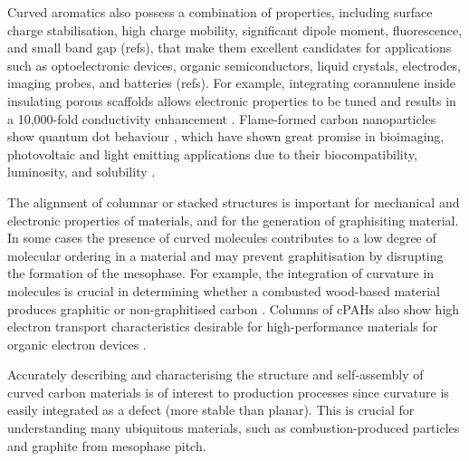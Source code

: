 Curved aromatics also possess a combination of properties, including surface charge stabilisation, high charge mobility, significant dipole moment, fluorescence, and small band gap (refs), that make them excellent candidates for applications such as optoelectronic devices, organic semiconductors, liquid crystals, electrodes, imaging probes, and batteries (refs). For example, integrating corannulene inside insulating porous scaffolds allows electronic properties to be tuned and results in a 10,000-fold conductivity enhancement \cite{rice2018stack}. Flame-formed carbon nanoparticles show quantum dot behaviour \cite{liu2019flame}, which have shown great promise in bioimaging, photovoltaic and light emitting applications due to their biocompatibility, luminosity, and solubility \cite{zhang2012graphene}.

The alignment of columnar or stacked structures is important for mechanical and electronic properties of materials, and for the generation of graphisiting material. In some cases the presence of curved molecules contributes to a low degree of molecular ordering in a material %
\cite{zhong2018structural} and may prevent graphitisation by disrupting the formation of the mesophase. For example, the integration of curvature in molecules is crucial in determining whether a combusted wood-based material produces graphitic or non-graphitised carbon \cite{abrahamson2018carbon}. Columns of cPAHs also show high electron transport characteristics desirable for high-performance materials for organic electron devices \cite{wang2015electronic}.

Accurately describing and characterising the structure and self-assembly of curved carbon materials is of interest to production processes since curvature is easily integrated as a defect (more stable than planar). This is crucial for understanding many ubiquitous materials, such as combustion-produced particles and graphite from mesophase pitch.
%

